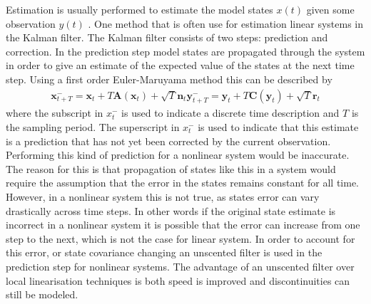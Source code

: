 Estimation is usually performed to estimate the model states $x(t)$ given some observation $y(t)$ . One method that is often use for estimation linear systems in the Kalman filter. The Kalman filter consists of two steps: prediction and correction. In the prediction step model states are propagated through the system in order to give an estimate of the expected value of the states at the next time step. Using a first order Euler-Maruyama method this can be described by \begin{align}
\mathbf{x}_{t+T}^{-} = \mathbf{x}_{t} + T\mathbf{A}(\mathbf{x}_{t}) +\sqrt{T}\mathbf{n}_{t}
\label{eqn: YProp}
\mathbf{y}_{t+T}^{-}  = \mathbf{y}_{t} + T\mathbf{C}(\mathbf{y}_{t}) +\sqrt{T}\mathbf{r}_{t}
\end{align} where the subscript in $x_{t}^{-}$ is used to indicate a discrete time description and $T$ is the sampling period. The superscript in $x_{t}^{-}$ is used to indicate that this estimate is a prediction that has not yet been corrected by the current observation. Performing this kind of prediction for a nonlinear system would be inaccurate. The reason for this is that propagation of states like this in a system would require the assumption that the error in the states remains constant for all time. However, in a nonlinear system this is not true, as states error can vary drastically across time steps. In other words if the original state estimate is incorrect in a nonlinear system it is possible that the error can increase from one step to the next, which is not the case for  linear system. In order to account for this error, or state covariance changing an unscented filter is used in the prediction step for nonlinear systems. The advantage of an unscented filter over local linearisation techniques is both speed is improved and discontinuities can still be modeled. 

